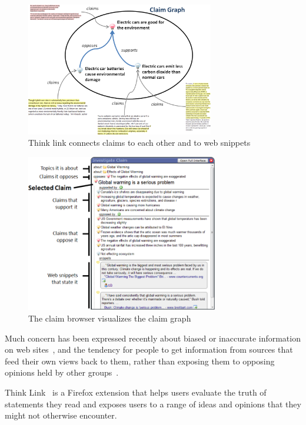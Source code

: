 \documentclass{chi2009}
\begin{document}
\begin{figure}[tb]
	\begin{center}
	\includegraphics[width=8.2cm]{../screenshots/summary_graph.png}
	\caption{Think link connects claims to each other and to web snippets}
	\label{summarygraph}
	\end{center}
\end{figure}

\begin{figure}[tb]
	\begin{center}
	\includegraphics[width=8.4cm]{../screenshots/claimbrowse_diagram.png}
	\caption{The claim browser visualizes the claim graph}
	\label{claimbrowse_diagram}
	\end{center}
\end{figure}


Much concern has been expressed recently about biased or inaccurate information on web sites~\cite{bbcwebwarning,wikifalse}, and the tendency for people to get information from sources that feed their own views back to them, rather than exposing them to opposing opinions held by other groups~\cite{echochamber,echochamber2}. 

Think Link~\cite{thinklink} is a Firefox extension that helps users evaluate the truth of statements they read and exposes users to a range of ideas and opinions that they might not otherwise encounter.
\end{document}
